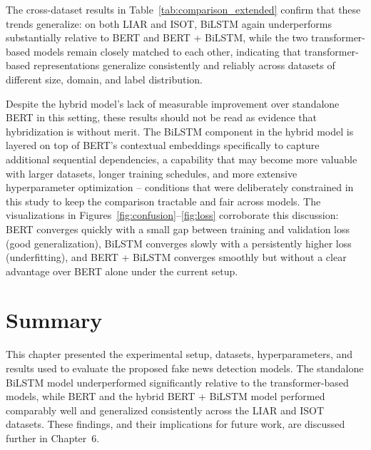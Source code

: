 The cross-dataset results in Table~\ref{tab:comparison_extended} confirm that these trends generalize: on both LIAR and ISOT, BiLSTM again underperforms substantially relative to BERT and BERT + BiLSTM, while the two transformer-based models remain closely matched to each other, indicating that transformer-based representations generalize consistently and reliably across datasets of different size, domain, and label distribution.

Despite the hybrid model's lack of measurable improvement over standalone BERT in this setting, these results should not be read as evidence that hybridization is without merit. The BiLSTM component in the hybrid model is layered on top of BERT's contextual embeddings specifically to capture additional sequential dependencies, a capability that may become more valuable with larger datasets, longer training schedules, and more extensive hyperparameter optimization -- conditions that were deliberately constrained in this study to keep the comparison tractable and fair across models. The visualizations in Figures~\ref{fig:confusion}--\ref{fig:loss} corroborate this discussion: BERT converges quickly with a small gap between training and validation loss (good generalization), BiLSTM converges slowly with a persistently higher loss (underfitting), and BERT + BiLSTM converges smoothly but without a clear advantage over BERT alone under the current setup.

\section{Summary}

This chapter presented the experimental setup, datasets, hyperparameters, and results used to evaluate the proposed fake news detection models. The standalone BiLSTM model underperformed significantly relative to the transformer-based models, while BERT and the hybrid BERT + BiLSTM model performed comparably well and generalized consistently across the LIAR and ISOT datasets. These findings, and their implications for future work, are discussed further in Chapter~6.
